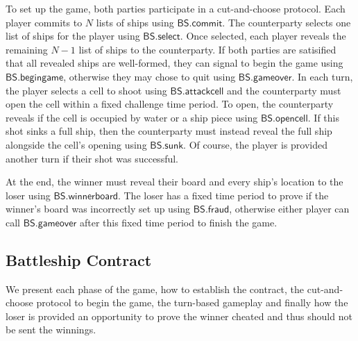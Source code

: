 \documentclass{llncs}
\newcommand{\battleshipfraud}{\mathsf{BS.fraud}}
\newcommand{\battleshipattackcell}{\mathsf{BS.attackcell}}
\newcommand{\battleshipbegin}{\mathsf{BS.begingame}}
\newcommand{\battleshipcommit}{\mathsf{BS.commit}}
\newcommand{\battleshipselectboard}{\mathsf{BS.select}}
\newcommand{\battleshiprevealcell}{\mathsf{BS.opencell}}
\newcommand{\battleshipsinking}{\mathsf{BS.sunk}}
\newcommand{\battleshiprevealboard}{\mathsf{BS.winnerboard}}
\newcommand{\battleshipgameover}{\mathsf{BS.gameover}}
\begin{document}
To set up the game, both parties participate in a cut-and-choose protocol.
Each player commits to $N$ lists of ships using $\battleshipcommit$. 
The counterparty selects one list of ships for the player using $\battleshipselectboard$.
Once selected, each player reveals the remaining $N-1$ list of ships to the counterparty. 
If both parties are satisified that all revealed ships are well-formed, they can signal to begin the game using $\battleshipbegin$, otherwise they may chose to quit using $\battleshipgameover$. 
In each turn, the player selects a cell to shoot using $\battleshipattackcell$ and the counterparty must open the cell  within a fixed challenge time period. 
To open, the counterparty reveals if the cell is occupied by water or a ship piece using $\battleshiprevealcell$.
If this shot sinks a full ship, then the counterparty must instead reveal the full ship alongside the cell's opening using $\battleshipsinking$. 
Of course, the player is provided another turn if their shot was successful.

At the end, the winner must reveal their board and every ship's location to the loser using $\battleshiprevealboard$.
The loser has a fixed time period to prove if the winner's board was incorrectly set up using $\battleshipfraud$, otherwise either player can call $\battleshipgameover$ after this fixed time period to finish the game. 

\subsection{Battleship Contract} 

We present each phase of the game, how to establish the contract, the cut-and-choose protocol to begin the game, the turn-based gameplay and finally how the loser is provided an opportunity to prove the winner cheated and thus should not be sent the winnings. 
\end{document}

